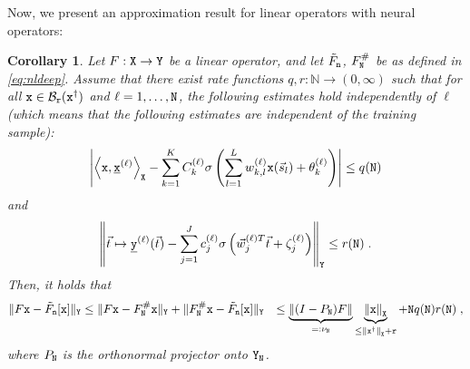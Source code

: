 \documentclass[10pt]{article}
\numberwithin{equation}{section}
\newtheorem{corollary}[corollary]{Corollary}
\theoremstyle{nonumberplain}
\newcommand{\N}{\mathds{N}}
\newcommand{\abs}[1]{\left|#1\right|}
\newcommand{\norm}[1]{\left\|#1\right\|}
\newcommand{\norms}[1]{\|#1\|}
\newcommand{\inner}[2]{\left<#1,#2\right>}
\newcommand{\bs}{\vec{s}}
\newcommand{\bt}{\vec{t}}
\newcommand{\bw}{{\vec{w}}}
\newcommand{\X}{{\tt X}}
\newcommand{\Y}{{\tt Y}}
\newcommand{\y}{{\tt y}}
\newcommand{\n}{{\tt n}}
\newcommand{\x}{{\tt x}}
\newcommand{\xdag}{\x^\dagger}
\newcommand{\ulx}{\underline{\x}}
\newcommand{\uly}{\underline{\y}}
\newcommand{\no}{{\tt N}}
\begin{document}
	Now, we present an approximation result for linear operators with neural operators:
	\begin{corollary} \label{cor:rate}
		Let $F:\X \to \Y$ be a linear operator, and let $\tilde{F}_\n$, $F_\no^\#$ be as defined in \autoref{eq:nldeep}. Assume that there exist rate functions $q,r :\N \to (0,\infty)$ such that for all $\x \in \mathcal{B}_{\tt r}(\xdag)$ and $\ell =1,\ldots,\no$, the following estimates hold independently of $\ell$ (which means that the following estimates are independent of the training sample):
		\begin{equation}\label{eq:qn}
			\abs{\inner{\x}{\ulx^{(\ell)}}_\X -  \sum_{k=1}^{K} C_k^{(\ell)}\sigma \left(\sum_{l=1}^{L}w_{k,l}^{(\ell)} \x(\bs_l)+\theta_{k}^{(\ell)}\right)} \leq q(\no)
		\end{equation}
		and 
		\begin{equation}\label{eq:rn}
			\norm{\bt \mapsto \uly^{(\ell)}(\bt)- \sum_{j=1}^{J}c_j^{(\ell)}\sigma\left(\bw_j^{(\ell)T}\bt + \zeta_j^{(\ell)}\right)}_\Y \leq r(\no)\;.
		\end{equation}
		Then, it holds that
		\begin{equation} \label{eq:estimate}
			\begin{aligned}
				\norms{F\x-\tilde{F}_\n[\x]}_\Y &\leq \norms{F\x-F_\no^\#\x}_\Y + \norms{F_\no^\#\x-\tilde{F}_\n[\x]}_\Y 
				&\leq \underbrace{\norms{(I-P_\no)F}}_{=:\nu_\no} \underbrace{\norm{\x}_\X}_{\leq \norm{\xdag}_\X +{\tt r}} +  \no q(\no) r(\no) \;,
			\end{aligned}
		\end{equation}
		where $P_{\no}$ is the orthonormal projector onto $\Y_\no$.		
	\end{corollary}
\end{document}
